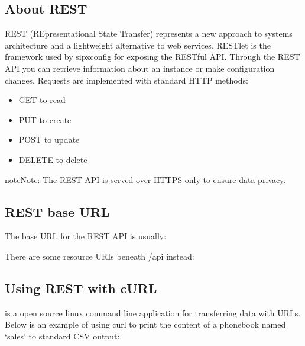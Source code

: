 \documentclass[letterpaper,10pt,english]{sphinxmanual}
\begin{document}
\subsection{About REST}
\label{\detokenize{restapi:about-rest}}
REST (REpresentational State Transfer) represents a new approach to systems architecture and a lightweight alternative to web services. RESTlet is the framework used by sipxconfig for exposing the RESTful API. Through the REST API you can retrieve information about an instance or make configuration changes. Requests are implemented with standard HTTP methods:
\begin{itemize}
\item {} 
GET to read

\item {} 
PUT to create

\item {} 
POST to update

\item {} 
DELETE to delete

\end{itemize}

\begin{sphinxadmonition}{note}{Note:}
The REST API is served over HTTPS only to ensure data privacy.
\end{sphinxadmonition}


\subsection{REST base URL}
\label{\detokenize{restapi:rest-base-url}}
The base URL for the REST API is usually:

\begin{sphinxVerbatim}[commandchars=\\\{\}]
\end{sphinxVerbatim}

There are some resource URIs beneath /api instead:

\begin{sphinxVerbatim}[commandchars=\\\{\}]
\end{sphinxVerbatim}


\subsection{Using REST with cURL}
\label{\detokenize{restapi:using-rest-with-curl}}
 is a open source linux command line application for transferring data with URLs. Below is an example of using curl to print the content of a phonebook named ‘sales’ to standard CSV output:
\end{document}
